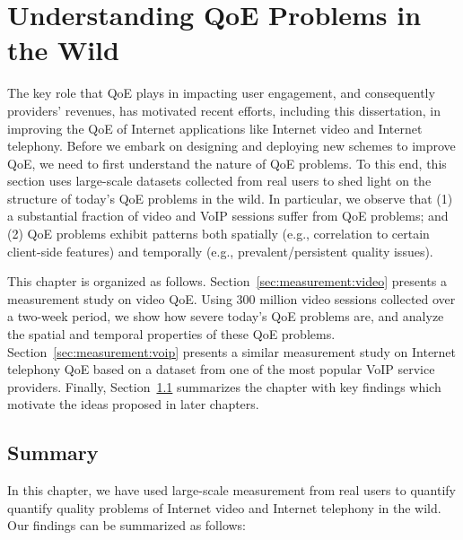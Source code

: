 \chapter{Understanding QoE Problems in the Wild}
\label{ch:measurement}

The key role that QoE plays in impacting user engagement,
and consequently providers' revenues, has motivated recent
efforts, including this dissertation, in improving the QoE of 
Internet applications like
Internet video and Internet telephony.
Before we embark on designing and deploying new 
schemes to improve QoE, we need to first understand 
the nature of QoE problems.
To this end, this section uses large-scale datasets collected
from real users to shed light on the structure of today's 
QoE problems  in the wild.
In particular, we observe that 
(1) a substantial fraction of video and VoIP 
sessions suffer from QoE problems; and
(2) QoE problems exhibit patterns both 
spatially (e.g., correlation to
certain client-side features) and temporally
(e.g., prevalent/persistent quality issues).

This chapter is organized as follows.
Section~\ref{sec:measurement:video} presents a 
measurement study on video QoE.
Using 300 million video sessions collected over a 
two-week period, we show how severe today's
QoE problems are, and  analyze the spatial
and temporal properties of these QoE problems.
Section~\ref{sec:measurement:voip} presents
a similar measurement study on Internet telephony 
QoE based on a dataset from one of the most 
popular VoIP  service providers.
Finally, Section~\ref{sec:measurement:summary} 
summarizes the chapter with key findings 
which motivate the ideas proposed in later 
chapters.









\section{Summary}
\label{sec:measurement:summary}

In this chapter, we have used large-scale measurement
from real users to quantify quantify quality problems of
Internet video and Internet telephony in the wild.
Our findings can be summarized as follows:

